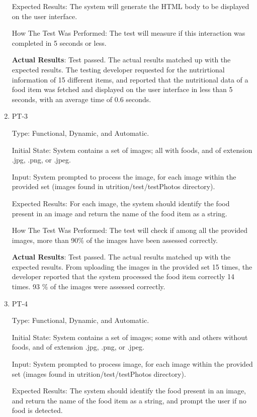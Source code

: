 \documentclass[12pt, titlepage]{article}
\begin{document}
\begin{enumerate}
		Expected Results: The system will generate the HTML body to be displayed on 
		the user 
		interface.
		
		How The Test Was Performed: The test will measure if this interaction 
		was completed in 5 seconds or less.
		
		\textbf{Actual Results}: Test passed. The actual results matched up with the expected results. The testing developer requested for the nutrirtional information of 15 different items, and reported that the nutritional data of a food item was fetched and displayed on the user interface in less than 5 seconds, with an average time of 0.6 seconds.
		
		\item{PT-3}
		
		Type: Functional, Dynamic, and Automatic.
		
		Initial State: System contains a set of images; all with foods, and of 
		extension .jpg, .png, or .jpeg.
		
		Input: System prompted to process the image, for each image 
		within the provided set (images found in utrition/test/testPhotos directory).
		
		Expected Results: For each image, the system should identify the food 
		present in an image and return the name of the food item as a string.
		
		How The Test Was Performed: The test will check if among all the 
		provided images, more than 90\% of the images have been assessed 
		correctly.
		
		\textbf{Actual Results}: Test passed. The actual results matched up with the expected results. From uploading the images in the provided set 15 times, the developer reported that the system processed the food item correctly 14 times. 93 \% of the images were assessed correctly.
		
		\item{PT-4}
		
		Type: Functional, Dynamic, and Automatic.
		
		Initial State: System contains a set of images; some with and others 
		without foods, and of extension .jpg, .png, or 
		.jpeg.
		
		Input: System prompted to process image, for each image 
		within the provided set (images found in utrition/test/testPhotos directory).
		
		Expected Results: The system should identify the food present in an image, 
		and return the name of the food item as a string, and prompt the user 
		if no food is detected.
		

\end{enumerate}
\end{document}
